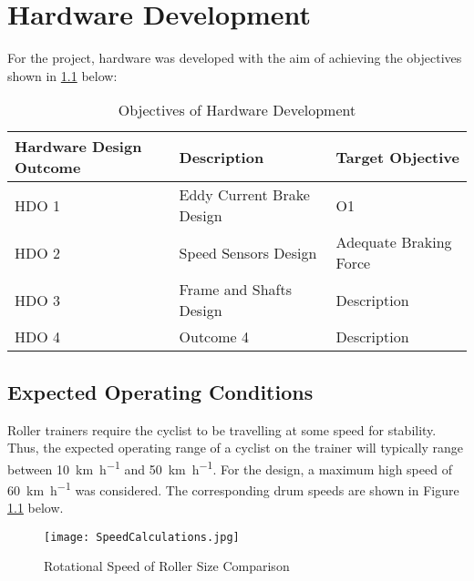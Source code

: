 
\chapter{Hardware Development}

For the project, hardware was developed with the aim of achieving the objectives shown in \ref{tab:devgoals} below:

\begin{table}[H]
	\renewcommand{\arraystretch}{1.2}
	\centering
	\caption{Objectives of Hardware Development}
	\begin{tabularx}{\textwidth}{p{3.2cm} >{\raggedright}p{5cm} >{\raggedright\arraybackslash}X}
		\toprule
		Hardware Design Outcome & Description               & Target Objective            \\
		\midrule
		HDO 1                   & Eddy Current Brake Design & O1 \\
		HDO 2                   & Speed Sensors Design      & Adequate Braking Force      \\
		HDO 3                   & Frame and Shafts Design   & Description                 \\
		HDO 4                   & Outcome 4                 & Description                 \\
		\bottomrule
	\end{tabularx}
	\label{tab:devgoals}
\end{table}

\newpage

\section{Expected Operating Conditions}

Roller trainers require the cyclist to be travelling at some speed for stability. Thus, the expected operating range of a cyclist on the trainer will typically range between \SI{10}{\kilo\meter\per\hour} and \SI{50}{\kilo\meter\per\hour}. For the design, a maximum high speed of \SI{60}{\kilo\meter\per\hour} was considered. The corresponding drum speeds are shown in Figure \ref{fig:speedCalc} below.

\begin{figure}[H]
	\begin{center}
		\texttt{[image: SpeedCalculations.jpg]}
		\caption{Rotational Speed of Roller Size Comparison}
		\label{fig:speedCalc}
	\end{center}
\end{figure}


